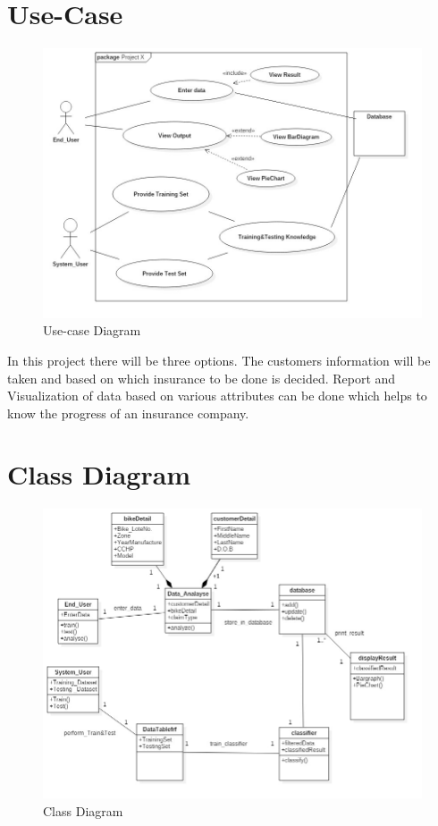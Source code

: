 \section{Use-Case}
\begin{figure}[tbh] %
\begin{center}
	\includegraphics[width = 6in]{images/uc.jpg}
	\caption{Use-case Diagram} %
	\label{Use-case} %
\end{center}
\end{figure}

In this project there will be three options. The customers information will be taken and based on which insurance to be done is decided. Report and Visualization of data based on various attributes can be done which helps to know the progress of an insurance company.
\newpage
\section{Class  Diagram}
\begin{figure}[tbh] %
\begin{center}
	\includegraphics[width = 6in]{images/Cd.png}
	\caption{Class Diagram} %
	\label{Class} %
\end{center}
\end{figure}


